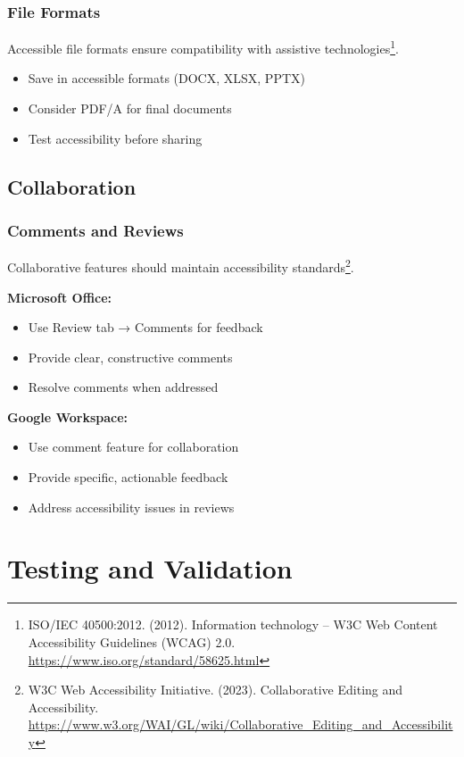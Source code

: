 \subsubsection{File Formats}
Accessible file formats ensure compatibility with assistive technologies\footnote{ISO/IEC 40500:2012. (2012). Information technology -- W3C Web Content Accessibility Guidelines (WCAG) 2.0. \url{https://www.iso.org/standard/58625.html}}.

\begin{itemize}
\item Save in accessible formats (DOCX, XLSX, PPTX)
\item Consider PDF/A for final documents
\item Test accessibility before sharing
\end{itemize}

\subsection{Collaboration}

\subsubsection{Comments and Reviews}
Collaborative features should maintain accessibility standards\footnote{W3C Web Accessibility Initiative. (2023). Collaborative Editing and Accessibility. \url{https://www.w3.org/WAI/GL/wiki/Collaborative_Editing_and_Accessibility}}.

\textbf{Microsoft Office:}
\begin{itemize}
\item Use Review tab → Comments for feedback
\item Provide clear, constructive comments
\item Resolve comments when addressed
\end{itemize}

\textbf{Google Workspace:}
\begin{itemize}
\item Use comment feature for collaboration
\item Provide specific, actionable feedback
\item Address accessibility issues in reviews
\end{itemize}

\section{Testing and Validation}

